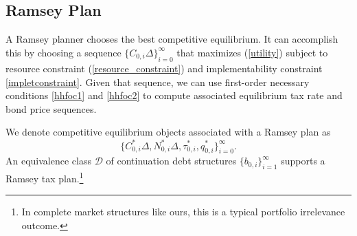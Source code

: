 \documentclass[12pt]{article}
\newcommand{\NW}[1]{{\textcolor{blue}{#1}}}
\newcommand{\WJ}[1]{{\textcolor{red}{#1}}}
\begin{document}
\subsection{Ramsey Plan} \label{subsec31}
A Ramsey planner chooses the best competitive equilibrium. It can accomplish this by  choosing a sequence   ${\{C_{0, i}\Delta\}}_{i=0}^\infty$  that maximizes  (\ref{utility}) 
subject to resource constraint (\ref{resource_constraint}) and 
implementability constraint \eqref{impletconstraint}.  Given that sequence, we can use  first-order necessary conditions
\eqref{hhfoc1} and \eqref{hhfoc2} to 
compute   associated equilibrium tax rate  and bond price sequences. 


We denote competitive equilibrium objects associated with a Ramsey plan as 
$$ \{C_{0, i}^\ast\Delta, N_{0, i}^\ast\Delta, \tau_{0, i}^\ast, q_{0, i}^\ast\}_{i= 0}^\infty. 
$$
An    equivalence class $\mathcal{D}$ of continuation debt structures $\{b_{0,i}\}_{i=1}^\infty$   supports a Ramsey tax plan.\footnote{In  complete market structures like ours, this is  a typical portfolio irrelevance  outcome.} %

%
%
\end{document}
